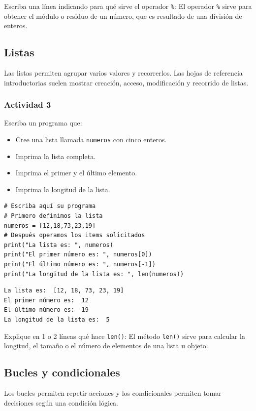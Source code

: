 \documentclass{article}
\begin{document}
Escriba una línea indicando para qué sirve el operador \texttt{\%}:
El operador \texttt{\%} sirve para obtener el módulo o residuo de un número,
que es resultado de una división de enteros. 

\subsection{Listas}
\label{sec:orgf617b3a}
Las listas permiten agrupar varios valores y recorrerlos. Las hojas de
referencia introductorias suelen mostrar creación, acceso,
modificación y recorrido de listas.

\subsubsection{Actividad 3}
\label{sec:org6947514}
Escriba un programa que:
\begin{itemize}
\item Cree una lista llamada \texttt{numeros} con cinco enteros.
\item Imprima la lista completa.
\item Imprima el primer y el último elemento.
\item Imprima la longitud de la lista.
\end{itemize}

\begin{verbatim}
# Escriba aquí su programa
# Primero definimos la lista
numeros = [12,18,73,23,19]
# Después operamos los items solicitados
print("La lista es: ", numeros)
print("El primer número es: ", numeros[0])
print("El último número es: ", numeros[-1])
print("La longitud de la lista es: ", len(numeros))
\end{verbatim}

\begin{verbatim}
La lista es:  [12, 18, 73, 23, 19]
El primer número es:  12
El último número es:  19
La longitud de la lista es:  5
\end{verbatim}


Explique en 1 o 2 líneas qué hace \texttt{len()}:
El método \texttt{len()} sirve para calcular la longitud, el tamaño o el
número de elementos de una lista u objeto. 

\subsection{Bucles y condicionales}
\label{sec:org239d69c}
Los bucles permiten repetir acciones y los condicionales permiten tomar decisiones según una condición lógica.
\end{document}
